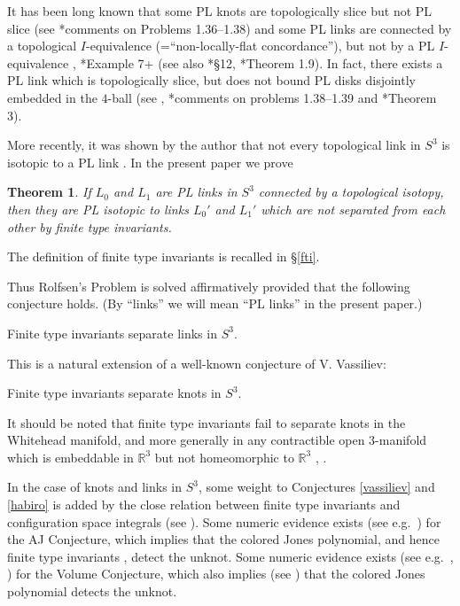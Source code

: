 \documentclass[a4paper,12pt,reqno,oneside]{amsart} %
\theoremstyle{plain}
\newtheorem{mainthm}{Theorem}
\newenvironment{cj}[1]
  {\renewcommand\theinnercj{#1}\innercj}
  {\endinnercj}
\theoremstyle{definition}
\theoremstyle{named}
\renewcommand{\:}{\colon}
\def\R{\mathbb{R}}
\begin{document}
It has been long known that some PL knots are topologically slice but not PL slice (see \cite{Kir}*{comments on Problems 1.36--1.38})
and some PL links are connected by a topological $I$-equivalence (=``non-locally-flat concordance''), but not by a PL $I$-equivalence 
\cite{Gi2}, \cite{Ro3}*{Example 7}+\cite{Gi1} (see also \cite{Da}*{\S12}, \cite{Hi}*{Theorem 1.9}).
In fact, there exists a PL link which is topologically slice, but does not bound PL disks disjointly embedded in the $4$-ball (see \cite{Fre}, 
\cite{Kir}*{comments on problems 1.38--1.39} and \cite{Ro3}*{Theorem 3}).

More recently, it was shown by the author that not every topological link in $S^3$ is isotopic to a PL link \cite{M21}.
In the present paper we prove

\begin{mainthm} \label{rolfsen}
If $L_0$ and $L_1$ are PL links in $S^3$ connected by a topological isotopy, then they are PL isotopic to links
$L_0'$ and $L_1'$ which are not separated from each other by finite type invariants.
\end{mainthm}

The definition of finite type invariants is recalled in \S\ref{fti}.

Thus Rolfsen's Problem is solved affirmatively provided that the following conjecture holds.
(By ``links'' we will mean ``PL links'' in the present paper.)

\begin{cj}{(L)}\label{habiro} Finite type invariants separate links in $S^3$.
\end{cj}

This is a natural extension of a well-known conjecture of V. Vassiliev:

\begin{cj}{(K)}[Vassiliev \cite{Va0}, \cite{Va}]\label{vassiliev} Finite type invariants separate knots in $S^3$.
\end{cj}

It should be noted that finite type invariants fail to separate knots in the Whitehead manifold, and more generally in 
any contractible open $3$-manifold which is embeddable in $\R^3$ but not homeomorphic to $\R^3$ \cite{Ei}, \cite{Ei'}.

In the case of knots and links in $S^3$, some weight to Conjectures \ref{vassiliev} and \ref{habiro} is added by the close relation between 
finite type invariants and configuration space integrals (see \cite{Ko}).
Some numeric evidence exists (see e.g.\ \cite{LT}) for the AJ Conjecture, which implies \cite{DuG} that the colored Jones polynomial, 
and hence finite type invariants \cite{MeMo}, detect the unknot.
Some numeric evidence exists (see e.g.\ \cite{Zh}, \cite{Wo}) for the Volume Conjecture, which also implies (see \cite{Tan}) that the colored 
Jones polynomial detects the unknot.
\end{document}
